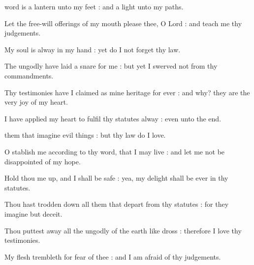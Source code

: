  word is a lantern unto my feet : and a light unto my paths.\par
{}
Let the free-will offerings of my mouth please thee, O Lord : and teach me thy judgements.\par
{}My soul is alway in my hand : yet do I not forget thy law.\par
{}The ungodly have laid a snare for me : but yet I swerved not from thy commandments.\par
{}Thy testimonies have I claimed as mine heritage for ever : and why? they are the very joy of my heart.\par
{}I have applied my heart to fulfil thy statutes alway : even unto the end.\par

 them that imagine evil things : but thy law do I love.\par
{}
O stablish me according to thy word, that I may live : and let me not be disappointed of my hope.\par
{}Hold thou me up, and I shall be safe : yea, my delight shall be ever in thy statutes.\par
{}Thou hast trodden down all them that depart from thy statutes : for they imagine but deceit.\par
{}Thou puttest away all the ungodly of the earth like dross : therefore I love thy testimonies.\par
{}My flesh trembleth for fear of thee : and I am afraid of thy judgements.\par

